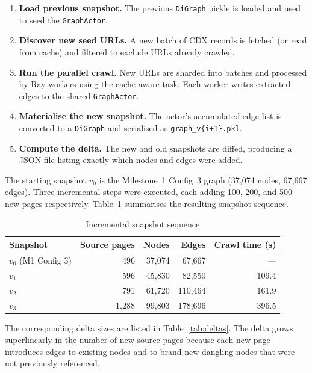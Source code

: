 \documentclass[11pt,a4paper]{article}
\begin{document}
\begin{enumerate}
    \item \textbf{Load previous snapshot.} The previous \texttt{DiGraph}
    pickle is loaded and used to seed the \texttt{GraphActor}.
    \item \textbf{Discover new seed URLs.} A new batch of CDX records is
    fetched (or read from cache) and filtered to exclude URLs already
    crawled.
    \item \textbf{Run the parallel crawl.} New URLs are sharded into
    batches and processed by Ray workers using the cache-aware task.
    Each worker writes extracted edges to the shared
    \texttt{GraphActor}.
    \item \textbf{Materialise the new snapshot.} The actor's accumulated
    edge list is converted to a \texttt{DiGraph} and serialised as
    \texttt{graph\_v\{i+1\}.pkl}.
    \item \textbf{Compute the delta.} The new and old snapshots are
    diffed, producing a JSON file listing exactly which nodes and edges
    were added.
\end{enumerate}

The starting snapshot $v_0$ is the Milestone~1 Config~3 graph
(37{,}074 nodes, 67{,}667 edges). Three incremental steps were executed,
each adding 100, 200, and 500 new pages respectively. Table~\ref{tab:snapshots}
summarises the resulting snapshot sequence.

\begin{table}[H]
\centering
\caption{Incremental snapshot sequence}
\label{tab:snapshots}
\begin{tabular}{lrrrr}
\toprule
\textbf{Snapshot} & \textbf{Source pages} & \textbf{Nodes} & \textbf{Edges} & \textbf{Crawl time (s)} \\
\midrule
$v_0$ (M1 Config 3) & 496   & 37{,}074 & 67{,}667  & --- \\
$v_1$               & 596   & 45{,}830 & 82{,}550  & 109.4 \\
$v_2$               & 791   & 61{,}720 & 110{,}464 & 161.9 \\
$v_3$               & 1{,}288 & 99{,}803 & 178{,}696 & 396.5 \\
\bottomrule
\end{tabular}
\end{table}

The corresponding delta sizes are listed in
Table~\ref{tab:deltas}. The delta grows superlinearly in the number of
new source pages because each new page introduces edges to existing
nodes and to brand-new dangling nodes that were not previously
referenced.
\end{document}
